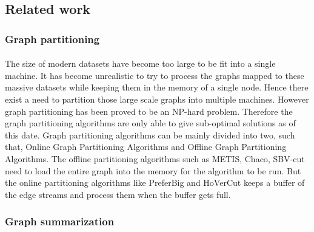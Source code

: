 \subsection{Related work}

\subsubsection{Graph partitioning}
\paragraph{}
The size of modern datasets have become too large to be fit into a single 
machine. It has become unrealistic to try to process the graphs mapped to 
these massive datasets while keeping them in the memory of a single node. 
Hence there exist a need to partition those large scale graphs into multiple 
machines. However graph partitioning has been proved to be an NP-hard 
problem\cite{garey_simplified_1974}. Therefore the graph partitioning algorithms are only able to give 
sub-optimal solutions as of this date. Graph partitioning algorithms can be 
mainly divided into two, such that, Online Graph Partitioning Algorithms and 
Offline Graph Partitioning Algorithms. The offline partitioning algorithms 
such as METIS\cite{karypis_fast_1998}, Chaco\cite{hendrickson_chaco_1993}, 
SBV-cut\cite{kim_sbv-cut:_2012} need to load the entire graph into the 
memory for the algorithm to be run. But the online partitioning algorithms 
like PreferBig\cite{stanton_streaming_2012} and 
HoVerCut\cite{sajjad_boosting_2016} keeps a buffer of the edge streams and 
process them when the buffer gets full. 

\subsubsection{Graph summarization}


